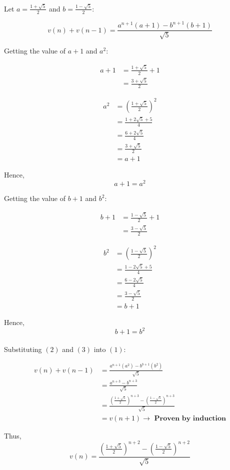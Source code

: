 \documentclass[11pt]{article}
\begin{document}
Let \(a = \frac{1 + \sqrt{5}}{2}\) and \(b = \frac{1 - \sqrt{5}}{2}\):

\begin{equation}
v(n) + v(n - 1) = \frac{a^{n+1}(a + 1) - b^{n+1}(b + 1)}{\sqrt{5}} \tag{1}
\end{equation}

Getting the value of \(a + 1\) and \(a^2\):

\begin{align*}
a + 1 &= \frac{1 + \sqrt{5}}{2} + 1 \\
&= \frac{3 + \sqrt{5}}{2}
\end{align*}

\begin{align*}
a^2 &= \left(\frac{1 + \sqrt{5}}{2}\right)^2 \\
&= \frac{1 + 2\sqrt{5} + 5}{4} \\
&= \frac{6 + 2\sqrt{5}}{4} \\
&= \frac{3 + \sqrt{5}}{2} \\
&= a + 1
\end{align*}

Hence,
\begin{equation}
a + 1 = a^2 \tag{2}
\end{equation}

\newpage

Getting the value of \(b + 1\) and \(b^2\):

\begin{align*}
b + 1 &= \frac{1 - \sqrt{5}}{2} + 1 \\
&= \frac{3 - \sqrt{5}}{2}
\end{align*}

\begin{align*}
b^2 &= \left(\frac{1 - \sqrt{5}}{2}\right)^2 \\
&= \frac{1 - 2\sqrt{5} + 5}{4} \\
&= \frac{6 - 2\sqrt{5}}{4} \\
&= \frac{3 - \sqrt{5}}{2} \\
&= b + 1
\end{align*}

Hence,
\begin{equation}
b + 1 = b^2 \tag{3}
\end{equation}
\\[0pt]

Substituting \((2)\) and \((3)\) into \((1)\):

\begin{align*}
v(n) + v(n - 1) &= \frac{a^{n+1}(a^2) - b^{b+1}(b^2)}{\sqrt{5}} \\
&= \frac{a^{n+3} - b^{n+3}}{\sqrt{5}} \\
&= \frac{(\frac{1 + \sqrt{5}}{2})^{n+3} - (\frac{1 - \sqrt{5}}{2})^{n+3}}{\sqrt{5}} \\
&= v(n + 1) \rightarrow \textbf{ Proven by induction}
\end{align*}

Thus,
\[v(n) = \frac{(\frac{1 + \sqrt{5}}{2})^{n+2} - (\frac{1 - \sqrt{5}}{2})^{n+2}}{\sqrt{5}}\]
\end{document}

